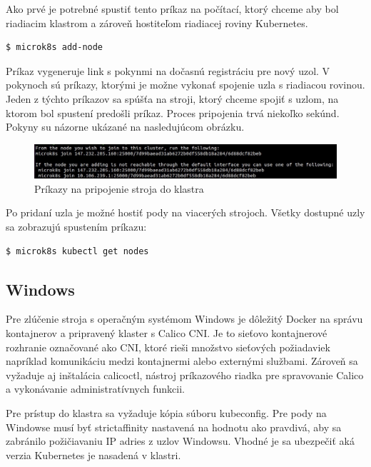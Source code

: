 Ako prvé je potrebné spustiť tento príkaz na počítací, ktorý chceme aby bol riadiacim klastrom a zároveň hostiteľom riadiacej roviny Kubernetes.

\begin{lstlisting}[language=Bash]
    $ microk8s add-node
    \end{lstlisting}

Príkaz vygeneruje link s pokynmi na dočasnú registráciu pre nový uzol. V pokynoch sú príkazy, ktorými je možne vykonať spojenie uzla s riadiacou rovinou. Jeden z týchto príkazov sa spúšťa na stroji, ktorý chceme spojiť s uzlom, na ktorom bol spustení predošli príkaz. Proces pripojenia trvá niekoľko sekúnd. Pokyny su názorne ukázané na nasledujúcom obrázku.

\begin{figure}[h!]
    \includegraphics[width=\linewidth]{figures/addnode}
    \caption{ Príkazy na pripojenie stroja do klastra }
\end{figure}

Po pridaní uzla je možné hostiť pody na viacerých strojoch. Všetky dostupné uzly sa zobrazujú spustením príkazu:

\begin{lstlisting}[language=Bash]
    $ microk8s kubectl get nodes
    \end{lstlisting}

\subsection*{Windows}

Pre zlúčenie stroja s operačným systémom Windows je dôležitý Docker na správu kontajnerov a pripravený klaster s Calico CNI. Je to sieťovo kontajnerové rozhranie označované ako CNI, ktoré rieši množstvo sieťových požiadaviek napríklad komunikáciu medzi kontajnermi alebo externými službami. Zároveň sa vyžaduje aj inštalácia calicoctl, nástroj príkazového riadka pre spravovanie Calico a vykonávanie administratívnych funkcii.

Pre prístup do klastra sa vyžaduje kópia súboru kubeconfig. Pre pody na Windowse musí byť strictaffinity nastavená na hodnotu ako pravdivá, aby sa zabránilo požičiavaniu IP adries z uzlov Windowsu. Vhodné je sa ubezpečiť aká verzia Kubernetes je nasadená v klastri.

